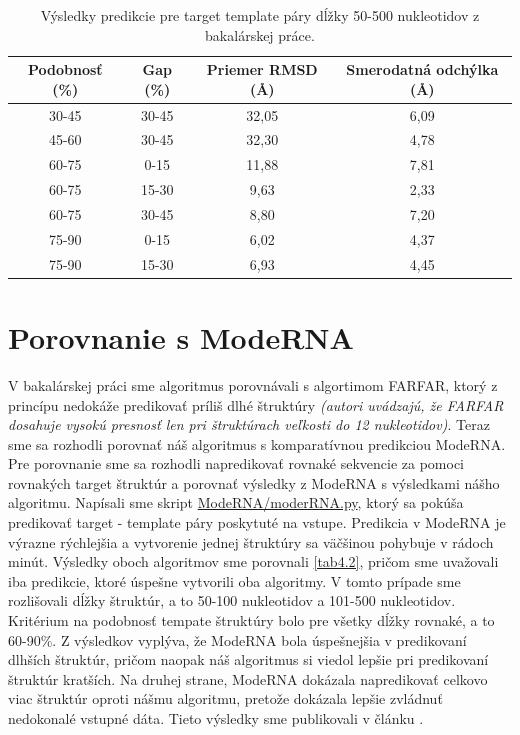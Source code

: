 \begin{table}[b!]
\centering
\begin{tabular}{cccc}
\toprule
Podobnosť (\%) & Gap (\%)  & Priemer RMSD (Å) & Smerodatná odchýlka  (Å)\\
\midrule
30-45  & 30-45 & 32,05 & 6,09 \\
45-60  & 30-45 & 32,30 & 4,78 \\
60-75  &   0-15 & 11,88 & 7,81 \\
60-75  & 15-30 &   9,63 & 2,33 \\
60-75  & 30-45 &   8,80 & 7,20 \\
75-90  &   0-15 &   6,02 & 4,37 \\
75-90  & 15-30 &   6,93 & 4,45 \\
\bottomrule
\end{tabular}
\caption{Výsledky predikcie pre target template páry dĺžky 50-500 nukleotidov z bakalárskej práce. }\label{tab4.1}
\end{table}


\section{Porovnanie s ModeRNA}
V bakalárskej práci sme algoritmus porovnávali s algortimom FARFAR, ktorý z princípu nedokáže predikovať príliš dlhé štruktúry \textit{(autori uvádzajú, že FARFAR dosahuje vysokú presnosť len pri štruktúrach veľkosti do 12 nukleotidov)}. Teraz sme sa rozhodli porovnať náš algoritmus s komparatívnou predikciou ModeRNA. Pre porovnanie sme sa rozhodli napredikovať rovnaké sekvencie za pomoci rovnakých target štruktúr a porovnať výsledky z ModeRNA s výsledkami nášho algoritmu. Napísali sme skript \url{ModeRNA/moderRNA.py}, ktorý sa pokúša predikovať target - template páry poskytuté na vstupe. Predikcia v ModeRNA je výrazne rýchlejšia a vytvorenie jednej štruktúry sa väčšinou pohybuje v rádoch minút. Výsledky oboch algoritmov sme porovnali \autoref{tab4.2}, pričom sme uvažovali iba predikcie, ktoré úspešne vytvorili oba algoritmy. V tomto prípade sme rozlišovali dĺžky štruktúr, a to 50-100 nukleotidov a 101-500 nukleotidov. Kritérium na podobnosť tempate štruktúry bolo pre všetky dĺžky rovnaké, a to 60-90\%. Z výsledkov vyplýva, že ModeRNA bola úspešnejšia v predikovaní dlhších štruktúr, pričom naopak náš algoritmus si viedol lepšie pri predikovaní štruktúr kratších. Na druhej strane, ModeRNA dokázala napredikovať celkovo viac štruktúr oproti nášmu algoritmu, pretože dokázala lepšie zvládnuť nedokonalé vstupné dáta. Tieto výsledky sme publikovali v článku \cite{7822808}.

